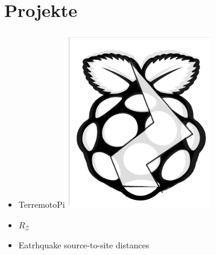 \documentclass{article}
\begin{document}
\begin{minipage}[t]{0.67\textwidth}
		\section*{\fontsize{18pt}{24pt}\selectfont \color{pblue} Projekte}
		\begin{itemize}
		\item TerremotoPi \href{https://github.com/silvioschwarz/TerremotoPi}{\includegraphics[scale=0.05]{../img/terremotoPiIcon.png}}
		\item $R_\mathcal{Z}$
		\item Eatrhquake source-to-site distances \href{https://github.com/silvioschwarz/Earthquake-Distances}{\faGithub}
		\end{itemize}
\end{minipage}
\end{document}
